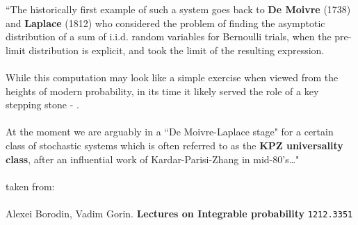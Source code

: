 \documentclass[12pt]{article}
\begin{document}
``The historically first example of such a system goes back to \textbf{De Moivre} (1738) and
\textbf{Laplace} (1812) who considered the problem of finding the asymptotic distribution of a sum
of i.i.d. random variables for Bernoulli trials, when the pre-limit distribution is explicit,
and took the limit of the resulting expression. \\ \\ 
\indent While this computation may look like a
simple exercise when viewed from the heights of modern probability, in its time it likely
served the role of a key stepping stone - {\color{blue!50!white!80!black}{first rigorous proofs of central limit theorems
appeared only in the beginning of the XXth century}}. \\ \\
\indent At the moment we are arguably in a ``De Moivre-Laplace stage" for a certain class
of stochastic systems which is often referred to as the \textbf{KPZ universality class}, after an
influential work of Kardar-Parisi-Zhang in mid-80's\dots" \\ \\

\selectfont \fontsize{25}{30}\selectfont
\noindent taken from: \\ \\
\selectfont \fontsize{20}{15}\selectfont
Alexei Borodin, Vadim Gorin.  \textbf{Lectures on Integrable probability} \texttt{1212.3351}
\end{document}
